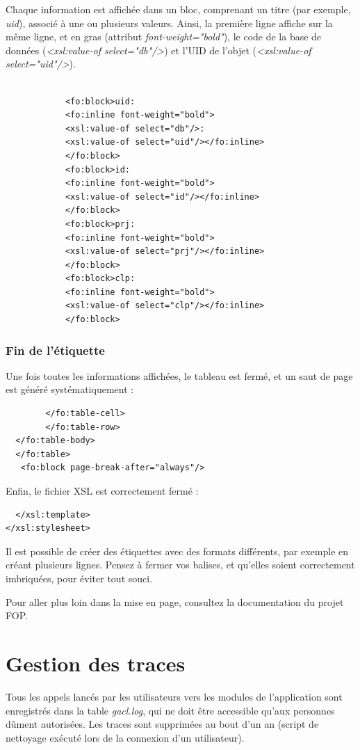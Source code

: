 Chaque information est affichée dans un bloc, comprenant un titre (par exemple, \textit{uid}), associé à une ou plusieurs valeurs. Ainsi, la première ligne affiche sur la même ligne, et en gras (attribut \textit{font-weight="bold"}), le code de la base de données (\textit{<xsl:value-of select="db"/>}) et l'UID de l'objet (\textit{<xsl:value-of select="uid"/>}).

\begin{lstlisting}   		

  			<fo:block>uid:
  			<fo:inline font-weight="bold">
  			<xsl:value-of select="db"/>:
  			<xsl:value-of select="uid"/></fo:inline>
  			</fo:block>
  			<fo:block>id:
  			<fo:inline font-weight="bold"> 
  			<xsl:value-of select="id"/></fo:inline>
  			</fo:block>
  			<fo:block>prj:
  			<fo:inline font-weight="bold"> 
  			<xsl:value-of select="prj"/></fo:inline>
  			</fo:block>
  			<fo:block>clp:
  			<fo:inline font-weight="bold">
  			<xsl:value-of select="clp"/></fo:inline>
  			</fo:block>
\end{lstlisting}

\subsubsection{Fin de l'étiquette}

Une fois toutes les informations affichées, le tableau est fermé, et un saut de page est généré systématiquement :
\begin{lstlisting}
  		</fo:table-cell>
  	  	</fo:table-row>
  </fo:table-body>
  </fo:table>
   <fo:block page-break-after="always"/>
\end{lstlisting}

Enfin, le fichier XSL est correctement fermé :
\begin{lstlisting}
  </xsl:template>
</xsl:stylesheet>
\end{lstlisting}

Il est possible de créer des étiquettes avec des formats différents, par exemple en créant plusieurs lignes. Pensez à fermer vos balises, et qu'elles soient correctement imbriquées, pour éviter tout souci.

Pour aller plus loin dans la mise en page, consultez la documentation du projet FOP.

\section{Gestion des traces}

Tous les appels lancés par les utilisateurs vers les modules de l'application sont enregistrés dans la table \textit{gacl.log}, qui ne doit être accessible qu'aux personnes dûment autorisées. Les traces sont supprimées au bout d'un an (script de nettoyage exécuté lors de la connexion d'un utilisateur).

